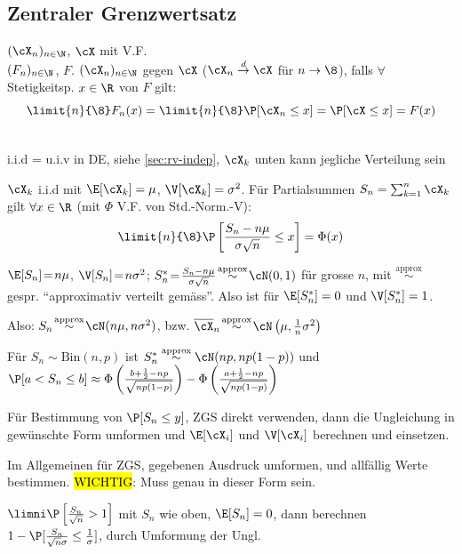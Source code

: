 \subsection{Zentraler Grenzwertsatz}
 $(\cX_n)_{n \in \N}$, $\cX$ mit V.F.\\
$(F_n)_{n \in \N}$, $F$.
$(\cX_n)_{n \in \N}$  gegen $\cX$
($\cX_n \overset{d}{\rightarrow} \cX$ für $n \rightarrow \8$), falls $\forall$ Stetigkeitsp. $x \in \R$ von $F$ gilt:
\[
    \limit{n}{\8} F_n(x) = \limit{n}{\8} \P[\cX_n \leq x] = \P[\cX \leq x] = F(x)
\]

\\
{\scriptsize i.i.d = u.i.v in DE, siehe \ref{sec:rv-indep}, $\cX_k$ unten kann jegliche Verteilung sein}

$\cX_k$ i.i.d mit $\E[\cX_k] = \mu$, $\V[\cX_k] = \sigma^2$. Für Partialsummen $S_n = \sum_{k = 1}^{n} \cX_k$ gilt $\forall x \in \R$ (mit $\Phi$ V.F. von Std.-Norm.-V):
\[
    \limit{n}{\8} \P \left[ \frac{S_n - n\mu}{\sigma \sqrt{n}} \leq x \right] = \Phi(x)
\]

\shortremark $\E[S_n] \! = \! n \mu$, $\V[S_n] \! = \! n \sigma^2$; $S_n^* \! = \! \frac{S_n - n\mu}{\sigma \sqrt{n}} \! \overset{\text{approx}}{\sim} \! \cN(0, 1)$
für grosse $n$, mit $\overset{\text{approx}}{\sim}$ gespr. ``approximativ verteilt gemäss''.
Also ist für $\E[S_n^*] = 0$ und $\V[S_n^*] = 1$.

Also: $S_n \! \overset{\text{approx}}{\sim} \! \cN(n\mu, n\sigma^2)$,
bzw. $\overline{\cX}_n \! \overset{\text{approx}}{\sim} \! \cN \left( \mu, \frac{1}{n} \sigma^2 \right)$

\shortremark Für $S_n \sim \text{Bin}(n, p)$ ist $S_n^* \overset{\text{approx}}{\sim} \cN(np, np(1 - p))$ und
$\P[a < S_n \leq b] \approx \Phi \left( \frac{b + \frac{1}{2} - np}{\sqrt{np(1 - p)}} \right) - \Phi \left( \frac{a + \frac{1}{2} - np}{\sqrt{np(1 - p)}} \right)$

\shortremark Für Bestimmung von $\P[S_n \leq y]$, ZGS direkt verwenden, dann die Ungleichung in gewünschte Form umformen und $\E[\cX_i]$ und $\V[\cX_i]$ berechnen und einsetzen.

\shortremark Im Allgemeinen für ZGS, gegebenen Ausdruck umformen, und allfällig Werte bestimmen.
\hl{WICHTIG}: Muss genau in dieser Form sein.

\shortexample $\limni \P\left[ \frac{S_n}{\sqrt{n}} > 1 \right]$ mit $S_n$ wie oben, $\E[S_n] = 0$, dann berechnen $1 - \P[ \frac{S_n}{\sqrt{n} \sigma} \leq \frac{1}{\sigma} ]$,
durch Umformung der Ungl.
